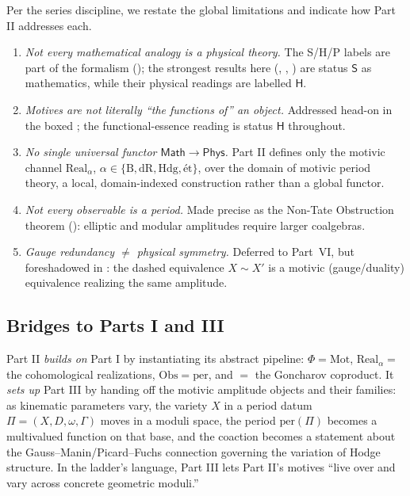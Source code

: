 \documentclass[12pt]{article}
\theoremstyle{definition}
\theoremstyle{remark}
\newcommand{\Mot}{\mathrm{Mot}}
\newcommand{\Real}{\mathrm{Real}}
\newcommand{\Obs}{\mathrm{Obs}}
\newcommand{\per}{\mathrm{per}}
\newcommand{\Math}{\mathsf{Math}}
\newcommand{\Phys}{\mathsf{Phys}}
\newcommand{\Betti}{\mathrm{B}}
\newcommand{\dR}{\mathrm{dR}}
\newcommand{\Hdg}{\mathrm{Hdg}}
\newcommand{\et}{\text{\'et}}
\newcommand{\Slab}{\ensuremath{\mathsf{S}}}
\newcommand{\Hlab}{\ensuremath{\mathsf{H}}}
\begin{document}
Per the series discipline, we restate the global limitations and indicate how Part II
addresses each.

\begin{enumerate}[leftmargin=1.6em]
\item \emph{Not every mathematical analogy is a physical theory.} The S/H/P labels are part of
the formalism (); the strongest results here (,
, ) are status \Slab{} as mathematics, while their
physical readings are labelled \Hlab.
\item \emph{Motives are not literally ``the functions of'' an object.} Addressed head-on in the
boxed ; the functional-essence reading is status \Hlab{} throughout.
\item \emph{No single universal functor $\Math\to\Phys$.} Part II defines only the motivic
channel $\Real_\alpha$, $\alpha\in\{\Betti,\dR,\Hdg,\et\}$, over the domain of motivic period
theory, a local, domain-indexed construction rather than a global functor.
\item \emph{Not every observable is a period.} Made precise as the Non-Tate Obstruction
theorem (): elliptic and modular amplitudes require larger coalgebras.
\item \emph{Gauge redundancy $\ne$ physical symmetry.} Deferred to Part~VI, but foreshadowed in
: the dashed equivalence $X\sim X'$ is a motivic (gauge/duality) equivalence
realizing the same amplitude.
\end{enumerate}

\subsection{Bridges to Parts I and III}

Part II \emph{builds on} Part I by instantiating its abstract pipeline: $\Phi=\Mot$,
$\Real_\alpha=$ the cohomological realizations, $\Obs=\per$, and $=$ the
Goncharov coproduct. It \emph{sets up} Part III by handing off the motivic amplitude objects
and their families: as kinematic parameters vary, the variety $X$ in a period datum
$\Pi=(X,D,\omega,\Gamma)$ moves in a moduli space, the period $\per(\Pi)$ becomes a
multivalued function on that base, and the coaction becomes a statement about the
Gauss--Manin/Picard--Fuchs connection governing the variation of Hodge structure. In the
ladder's language, Part III lets Part II's motives ``live over and vary across concrete
geometric moduli.''
\end{document}
